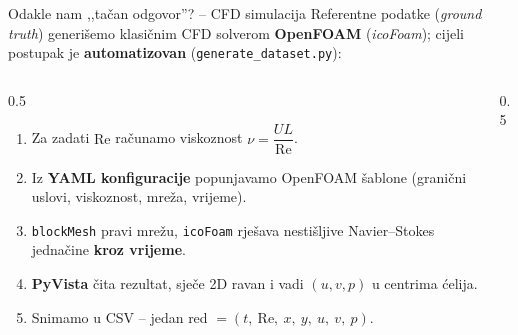 \documentclass[10pt,aspectratio=169]{beamer}
\begin{document}
\begin{frame}{Odakle nam ,,tačan odgovor''? -- CFD simulacija}
  \small
  Referentne podatke (\emph{ground truth}) generišemo klasičnim CFD solverom
  \textbf{OpenFOAM} (\emph{icoFoam}); cijeli postupak je \textbf{automatizovan}
  (\texttt{generate\_dataset.py}):
  \vfill
  \begin{columns}[T]
    \begin{column}{0.5\textwidth}
      \begin{enumerate}
        \item Za zadati $\mathrm{Re}$ računamo viskoznost
              $\nu = \dfrac{U L}{\mathrm{Re}}$.
        \item Iz \textbf{YAML konfiguracije} popunjavamo OpenFOAM šablone
              (granični uslovi, viskoznost, mreža, vrijeme).
        \item \texttt{blockMesh} pravi mrežu, \texttt{icoFoam} rješava
              nestišljive Navier--Stokes jednačine \textbf{kroz vrijeme}.
        \item \textbf{PyVista} čita rezultat, sječe 2D ravan i vadi
              $(u,v,p)$ u centrima ćelija.
        \item Snimamo u CSV -- jedan red $= (t,\ \mathrm{Re},\ x,\ y,\ u,\ v,\ p)$.
      \end{enumerate}
    \end{column}
    \begin{column}{0.5\textwidth}
      \centering
    \end{column}
  \end{columns}
\end{frame}
\end{document}
